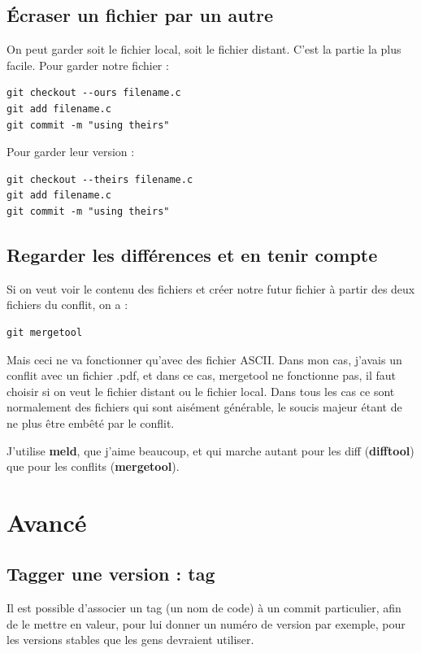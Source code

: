 \documentclass[a4paper,twoside]{article}
\begin{document}
\subsection{Écraser un fichier par un autre}
On peut garder soit le fichier local, soit le fichier distant. C'est la partie la plus facile. Pour garder notre fichier :
\begin{verbatim}
git checkout --ours filename.c
git add filename.c
git commit -m "using theirs"
\end{verbatim}

Pour garder leur version :
\begin{verbatim}
git checkout --theirs filename.c
git add filename.c
git commit -m "using theirs"
\end{verbatim}

\subsection{Regarder les différences et en tenir compte}
Si on veut voir le contenu des fichiers et créer notre futur fichier à partir des deux fichiers du conflit, on a :
\begin{verbatim}
git mergetool
\end{verbatim}

Mais ceci ne va fonctionner qu'avec des fichier ASCII. Dans mon cas, j'avais un conflit avec un fichier .pdf, et dans ce cas, mergetool ne fonctionne pas, il faut choisir si on veut le fichier distant ou le fichier local. Dans tous les cas ce sont normalement des fichiers qui sont aisément générable, le soucis majeur étant de ne plus être embêté par le conflit.

\begin{remarque}
J'utilise \textbf{meld}, que j'aime beaucoup, et qui marche autant pour les diff (\textbf{difftool}) que pour les conflits (\textbf{mergetool}).
\end{remarque}

\section{Avancé}
\subsection{Tagger une version : tag}
Il est possible d'associer un tag (un nom de code) à un commit particulier, afin de le mettre en valeur, pour lui donner un numéro de version par exemple, pour les versions stables que les gens devraient utiliser.
\end{document}
